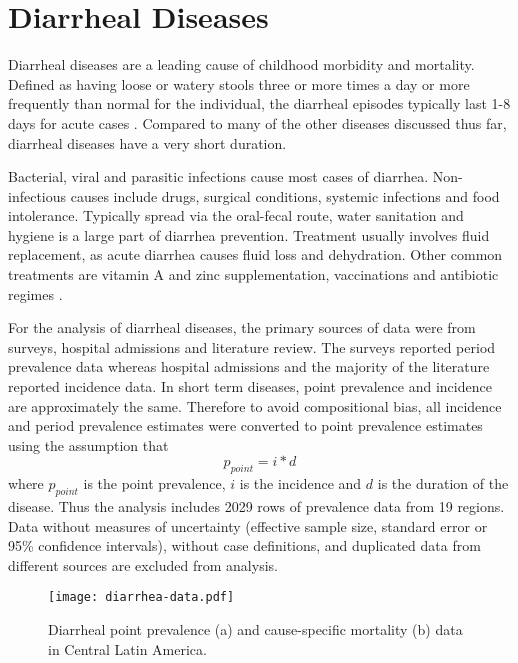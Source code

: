 \chapter{Diarrheal Diseases}
\label{applications-short_dur}

Diarrheal diseases are a leading cause of childhood morbidity and mortality.  Defined as having loose or watery stools three or more times a day or more frequently than normal for the individual, the diarrheal episodes typically last 1-8 days for acute cases \cite{unicef_diarrhoea_2009, carlos_etiology_1990, lamberti_systematic_2012}.  Compared to many of the other diseases discussed thus far, diarrheal diseases have a very short duration.

Bacterial, viral and parasitic infections cause most cases of diarrhea.  Non-infectious causes include drugs, surgical conditions, systemic infections and food intolerance.  Typically spread via the oral-fecal route, water sanitation and hygiene is a large part of diarrhea prevention.  Treatment usually involves fluid replacement, as acute diarrhea causes fluid loss and dehydration.  Other common treatments are vitamin A and zinc supplementation, vaccinations and antibiotic regimes \cite{unicef_diarrhoea_2009, carlos_etiology_1990, lamberti_systematic_2012}.

For the analysis of diarrheal diseases, the primary sources of data were from surveys, hospital admissions and literature review.  The surveys reported period prevalence data whereas hospital admissions and the majority of the literature reported incidence data.  In short term diseases, point prevalence and incidence are approximately the same.  Therefore to avoid compositional bias, all incidence and period prevalence estimates were converted to point prevalence estimates using the assumption that
    \begin{equation}
    	p_{point}=i*d
    \end{equation}
where $p_{point}$ is the point prevalence, $i$ is the incidence and $d$ is the duration of the disease.  Thus the analysis includes 2029 rows of prevalence data from 19 regions.  Data without measures of uncertainty (effective sample size, standard error or 95\% confidence intervals), without case definitions, and duplicated data from different sources are excluded from analysis.

    \begin{figure}[h]
        \begin{center}
            \texttt{[image: diarrhea-data.pdf]}
            \caption{Diarrheal point prevalence (a) and cause-specific mortality (b) data in Central Latin America.}
            \label{fig:app-diarrhea data}
        \end{center}
    \end{figure}

